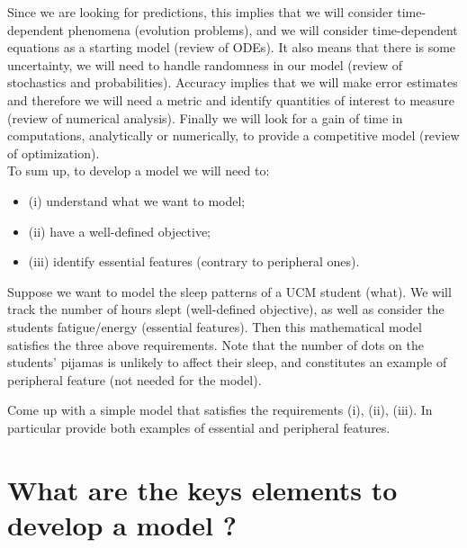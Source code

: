 Since we are looking for predictions, this implies that we will consider time-dependent phenomena (evolution problems), and we will consider time-dependent equations as a starting model (review of ODEs). It also means that there is some uncertainty, we will need to handle randomness in our model (review of stochastics and probabilities). Accuracy implies that we will make error estimates and therefore we will need a metric and identify quantities of interest to measure (review of numerical analysis). Finally we will look for a gain of time in computations, analytically or numerically, to provide a competitive model (review of optimization).\\

To sum up, to develop a model we will need to:
\begin{itemize}
\item (i) understand what we want to model;
\item (ii) have a well-defined objective;
\item (iii) identify essential features (contrary to peripheral ones).
\end{itemize}

\begin{Example}
Suppose we want to model the sleep patterns of a UCM student (what). We will track the number of hours slept (well-defined objective), as well as consider the students fatigue/energy (essential features). Then this mathematical model satisfies the three above requirements. Note that the number of dots on the students' pijamas is unlikely to affect their sleep, and constitutes an example of peripheral feature (not needed for the model).
\end{Example}
\begin{Exercise}
Come up with a simple model that satisfies the requirements (i), (ii), (iii). In particular provide both examples of essential and peripheral features.

\dotfill

\dotfill

\dotfill

\dotfill

\dotfill

\dotfill

\dotfill

\dotfill

\dotfill

\dotfill
\end{Exercise}
\section{What are the keys elements to develop a model ? }


